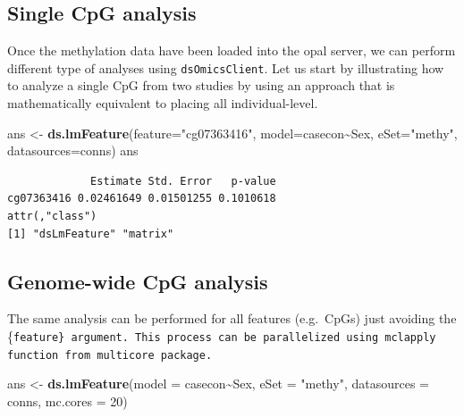 \documentclass[]{article}
\newenvironment{Shaded}{\begin{snugshade}}{\end{snugshade}}
\newcommand{\DataTypeTok}[1]{\textcolor[rgb]{0.13,0.29,0.53}{#1}}
\newcommand{\DecValTok}[1]{\textcolor[rgb]{0.00,0.00,0.81}{#1}}
\newcommand{\KeywordTok}[1]{\textcolor[rgb]{0.13,0.29,0.53}{\textbf{#1}}}
\newcommand{\NormalTok}[1]{#1}
\newcommand{\OperatorTok}[1]{\textcolor[rgb]{0.81,0.36,0.00}{\textbf{#1}}}
\newcommand{\StringTok}[1]{\textcolor[rgb]{0.31,0.60,0.02}{#1}}
\begin{document}
\hypertarget{single-cpg-analysis}{%
\subsection{Single CpG analysis}\label{single-cpg-analysis}}

Once the methylation data have been loaded into the opal server, we can
perform different type of analyses using \texttt{dsOmicsClient}. Let us
start by illustrating how to analyze a single CpG from two studies by
using an approach that is mathematically equivalent to placing all
individual-level.

\begin{Shaded}
\begin{Highlighting}[]
\NormalTok{ans <{-}}\StringTok{ }\KeywordTok{ds.lmFeature}\NormalTok{(}\DataTypeTok{feature=}\StringTok{"cg07363416"}\NormalTok{, }
                    \DataTypeTok{model=}\NormalTok{casecon}\OperatorTok{\textasciitilde{}}\NormalTok{Sex, }
                    \DataTypeTok{eSet=}\StringTok{"methy"}\NormalTok{,}
                    \DataTypeTok{datasources=}\NormalTok{conns)}
\NormalTok{ans}
\end{Highlighting}
\end{Shaded}

\begin{verbatim}
             Estimate Std. Error   p-value
cg07363416 0.02461649 0.01501255 0.1010618
attr(,"class")
[1] "dsLmFeature" "matrix"     
\end{verbatim}

\hypertarget{genome-wide-cpg-analysis}{%
\subsection{Genome-wide CpG analysis}\label{genome-wide-cpg-analysis}}

The same analysis can be performed for all features (e.g.~CpGs) just
avoiding the \{\tt feature\} argument. This process can be parallelized
using \texttt{mclapply} function from \texttt{multicore} package.

\begin{Shaded}
\begin{Highlighting}[]
\NormalTok{ans <{-}}\StringTok{ }\KeywordTok{ds.lmFeature}\NormalTok{(}\DataTypeTok{model =}\NormalTok{ casecon}\OperatorTok{\textasciitilde{}}\NormalTok{Sex, }
                    \DataTypeTok{eSet =} \StringTok{"methy"}\NormalTok{,}
                    \DataTypeTok{datasources =}\NormalTok{ conns,}
                    \DataTypeTok{mc.cores =} \DecValTok{20}\NormalTok{)}
\end{Highlighting}
\end{Shaded}
\end{document}
